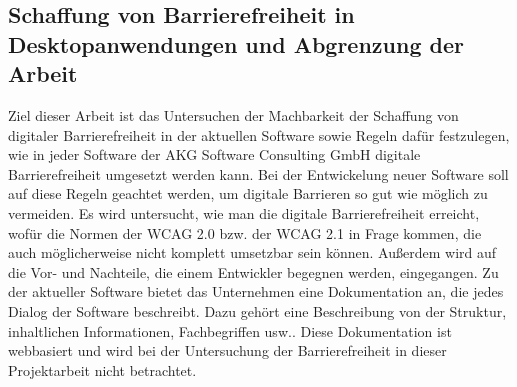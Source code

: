 \subsection{Schaffung von Barrierefreiheit in Desktopanwendungen und Abgrenzung der Arbeit}
\label{subsec: Schaffung von Barrierefreiheit in Desktopanwendungen und Abgrenzung der Arbeit}

Ziel dieser Arbeit ist das Untersuchen der Machbarkeit der Schaffung von digitaler Barrierefreiheit in der aktuellen Software sowie Regeln dafür festzulegen, wie in jeder Software der AKG Software Consulting GmbH digitale Barrierefreiheit umgesetzt werden kann. Bei der Entwickelung neuer Software soll auf diese Regeln geachtet werden, um digitale Barrieren so gut wie möglich zu vermeiden. Es wird untersucht, wie man die digitale Barrierefreiheit erreicht, wofür die Normen der \ac{WCAG} 2.0 bzw. der \ac{WCAG} 2.1 in Frage kommen, die auch möglicherweise nicht komplett umsetzbar sein können. Außerdem wird auf die Vor- und Nachteile, die einem Entwickler begegnen werden, eingegangen. Zu der aktueller Software bietet das Unternehmen eine Dokumentation an, die jedes Dialog der Software beschreibt. Dazu gehört eine Beschreibung von der Struktur, inhaltlichen Informationen, Fachbegriffen usw.. Diese Dokumentation ist webbasiert und wird bei der Untersuchung der Barrierefreiheit in dieser Projektarbeit nicht betrachtet.